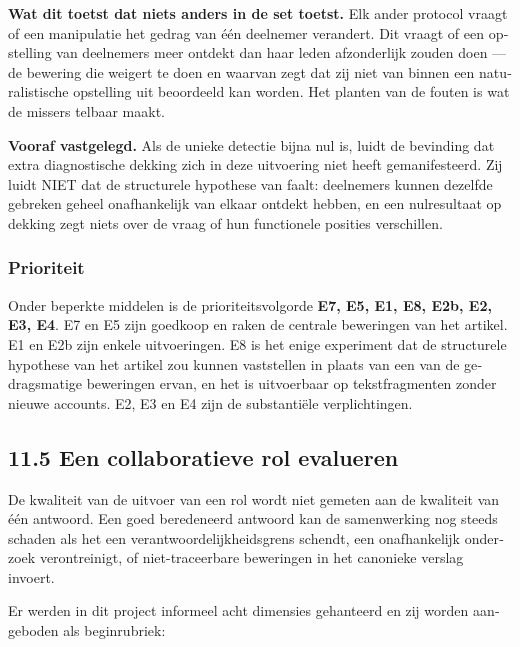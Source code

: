 \begin{dutch}
\textbf{Wat dit toetst dat niets anders in de set toetst.} Elk ander protocol vraagt of een manipulatie het gedrag van één deelnemer verandert. Dit vraagt of een opstelling van deelnemers meer ontdekt dan haar leden afzonderlijk zouden doen — de bewering die  weigert te doen en waarvan  zegt dat zij niet van binnen een naturalistische opstelling uit beoordeeld kan worden. Het planten van de fouten is wat de missers telbaar maakt.

\textbf{Vooraf vastgelegd.} Als de unieke detectie bijna nul is, luidt de bevinding dat extra diagnostische dekking zich in deze uitvoering niet heeft gemanifesteerd. Zij luidt NIET dat de structurele hypothese van  faalt: deelnemers kunnen dezelfde gebreken geheel onafhankelijk van elkaar ontdekt hebben, en een nulresultaat op dekking zegt niets over de vraag of hun functionele posities verschillen.


\subsubsection*{Prioriteit}
\label{sec:nl:x-prioriteit}

Onder beperkte middelen is de prioriteitsvolgorde \textbf{E7, E5, E1, E8, E2b, E2, E3, E4}. E7 en E5 zijn goedkoop en raken de centrale beweringen van het artikel. E1 en E2b zijn enkele uitvoeringen. E8 is het enige experiment dat de structurele hypothese van het artikel zou kunnen vaststellen in plaats van een van de gedragsmatige beweringen ervan, en het is uitvoerbaar op tekstfragmenten zonder nieuwe accounts. E2, E3 en E4 zijn de substantiële verplichtingen.


\subsection*{11.5 Een collaboratieve rol evalueren}
\label{sec:nl:11.5}

De kwaliteit van de uitvoer van een rol wordt niet gemeten aan de kwaliteit van één antwoord. Een goed beredeneerd antwoord kan de samenwerking nog steeds schaden als het een verantwoordelijkheidsgrens schendt, een onafhankelijk onderzoek verontreinigt, of niet-traceerbare beweringen in het canonieke verslag invoert.

Er werden in dit project informeel acht dimensies gehanteerd en zij worden aangeboden als beginrubriek:


\end{dutch}
